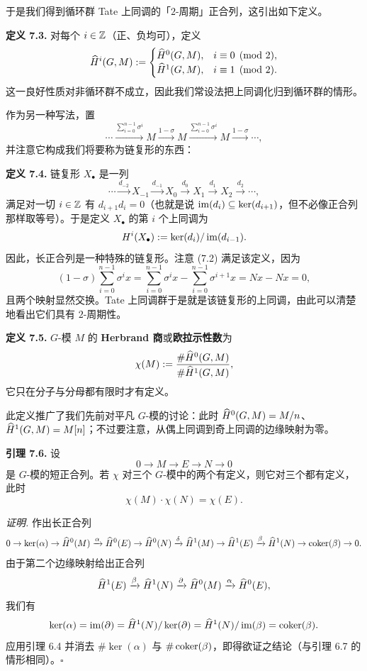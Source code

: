 于是我们得到循环群 Tate 上同调的「$2$-周期」正合列，这引出如下定义。

\textbf{定义 7.3.} 对每个 $i\in\mathbb{Z}$（正、负均可），定义
\[
\widehat{H}^i(G,M):=
\begin{cases}
\widehat{H}^0(G,M), & i\equiv 0 \pmod 2,\\
\widehat{H}^1(G,M), & i\equiv 1 \pmod 2.
\end{cases}
\]
这一良好性质对非循环群不成立，因此我们常设法把上同调化归到循环群的情形。

作为另一种写法，置
\begin{equation}\tag{7.2}
\cdots\xrightarrow{\sum_{i=0}^{n-1}\sigma^i}M\xrightarrow{1-\sigma}M\xrightarrow{\sum_{i=0}^{n-1}\sigma^i}M\xrightarrow{1-\sigma}\cdots,
\end{equation}
并注意它构成我们将要称为链复形的东西：

\textbf{定义 7.4.} 链复形 $X_\bullet$ 是一列
\[
\cdots\xrightarrow{d_{-2}}X_{-1}\xrightarrow{d_{-1}}X_0\xrightarrow{d_0}X_1\xrightarrow{d_1}X_2\xrightarrow{d_2}\cdots,
\]
满足对一切 $i\in\mathbb{Z}$ 有 $d_{i+1}d_i=0$（也就是说 $\operatorname{im}(d_i)\subseteq\ker(d_{i+1})$，但不必像正合列那样取等号）。于是定义 $X_\bullet$ 的第 $i$ 个上同调为
\[
H^i(X_\bullet):=\ker(d_i)/\operatorname{im}(d_{i-1}).
\]
因此，长正合列是一种特殊的链复形。注意 (7.2) 满足该定义，因为
\[
(1-\sigma)\sum_{i=0}^{n-1}\sigma^i x=\sum_{i=0}^{n-1}\sigma^i x-\sum_{i=0}^{n-1}\sigma^{i+1}x=Nx-Nx=0,
\]
且两个映射显然交换。Tate 上同调群于是就是该链复形的上同调，由此可以清楚地看出它们具有 $2$-周期性。

\textbf{定义 7.5.} $G$-模 $M$ 的 \textbf{Herbrand 商}或\textbf{欧拉示性数}为
\[
\chi(M):=\frac{\#\widehat{H}^0(G,M)}{\#\widehat{H}^1(G,M)},
\]
它只在分子与分母都有限时才有定义。

此定义推广了我们先前对平凡 $G$-模的讨论：此时 $\widehat{H}^0(G,M)=M/n$、$\widehat{H}^1(G,M)=M[n]$；不过要注意，从偶上同调到奇上同调的边缘映射为零。

\textbf{引理 7.6.} 设
\[
0\to M\to E\to N\to 0
\]
是 $G$-模的短正合列。若 $\chi$ 对三个 $G$-模中的两个有定义，则它对三个都有定义，此时
\[
\chi(M)\cdot\chi(N)=\chi(E).
\]

\textit{证明.} 作出长正合列
\[
0\to\ker(\alpha)\to\widehat{H}^0(M)\xrightarrow{\alpha}\widehat{H}^0(E)\to\widehat{H}^0(N)\xrightarrow{\delta}\widehat{H}^1(M)\to\widehat{H}^1(E)\xrightarrow{\beta}\widehat{H}^1(N)\to\operatorname{coker}(\beta)\to 0 .
\]
由于第二个边缘映射给出正合列
\[
\widehat{H}^1(E)\xrightarrow{\beta}\widehat{H}^1(N)\xrightarrow{\partial}\widehat{H}^0(M)\xrightarrow{\alpha}\widehat{H}^0(E),
\]
我们有
\[
\ker(\alpha)=\operatorname{im}(\partial)=\widehat{H}^1(N)/\ker(\partial)=\widehat{H}^1(N)/\operatorname{im}(\beta)=\operatorname{coker}(\beta).
\]
应用引理 6.4 并消去 $\#\ker(\alpha)$ 与 $\#\operatorname{coker}(\beta)$，即得欲证之结论（与引理 6.7 的情形相同）。\hfill$\square$

